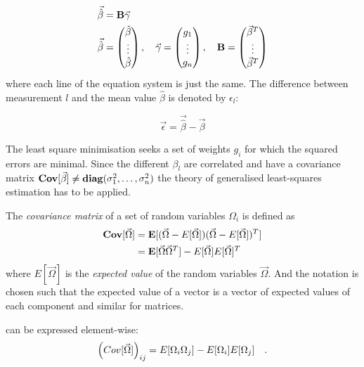 \begin{align}
    \vec{\hat{\beta}} &= \mathbf{B}\vec{\gamma}
    \label{eq_beta_wmean_vec}\\
    \vec{\hat{\beta}} &= 
    \begin{pmatrix}
        \hat{\beta}\\
        \vdots\\
        \hat{\beta}
    \end{pmatrix},\quad
    \vec{\gamma} =
    \begin{pmatrix}
        g_1\\
        \vdots\\
        g_n
    \end{pmatrix},\quad
    \mathbf{B} =
    \begin{pmatrix}
        \vec{\beta}^T\\
        \vdots\\
        \vec{\beta}^T
    \end{pmatrix}
\end{align}
where each line of the equation system is just the same.
The difference between measurement $l$ and the mean value $\hat{\beta}$ is denoted by $\epsilon_l$:

\begin{equation}
    \vec{\epsilon} = \vec{\hat{\beta}} - \vec{\beta}
\end{equation}

The least square minimisation seeks a set of weights $g_i$ for which the squared errors are minimal. Since the different $\beta_l$
are correlated and have a covariance matrix $\mathbf{Cov}[\vec{\beta}] \neq \mathbf{diag}(\sigma_1^2, \ldots, \sigma_n^2)$
the theory of generalised least-squares estimation has to be applied.

The \emph{covariance matrix} of a set of random variables $\Omega_i$ is defined as
\begin{align}
    \mathbf{Cov}[\vec{\Omega}] &= \mathbf{E}[(\vec{\Omega} - E[\vec{\Omega}])(\vec{\Omega} - E[\vec{\Omega}])^T]
    \notag \\
    &= \mathbf{E}[\vec{\Omega}\vec{\Omega}^T] - E[\vec{\Omega}]E[\vec{\Omega}]^T
    \label{eq_def_cov}
\end{align}
where $E[\vec{\Omega}]$ is the \emph{expected value} of the random variables $\vec{\Omega}$. And the
notation is chosen such that the expected value of a vector is a vector
of expected values of each component and similar for matrices.

 can be expressed element-wise:
\begin{equation}
    \left(Cov[\vec{\Omega}]\right)_{ij} = E[\Omega_i\Omega_j] - E[\Omega_i]E[\Omega_j]
    \quad .
\end{equation}

